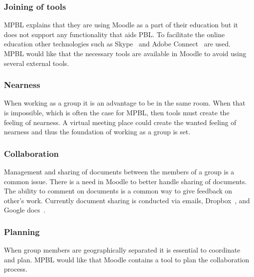 \subsubsection{Joining of tools} MPBL explains that they are using Moodle as a part of their education but it does not support any functionality that aids PBL. 
To facilitate the online education other technologies such as Skype~\cite{skype} and Adobe Connect~\cite{adobe} are used. 
MPBL would like that the necessary tools are available in Moodle to avoid using several external tools.     

\subsubsection{Nearness} When working as a group it is an advantage to be in the same room.
When that is impossible, which is often the case for MPBL, then tools must create the feeling of nearness. 
A virtual meeting place could create the wanted feeling of nearness and thus the foundation of working as a group is set.

\subsubsection{Collaboration} Management and sharing of documents between the members of a group is a common issue. 
There is a need in Moodle to better handle sharing of documents. 
The ability to comment on documents is a common way to give feedback on other's work. 
Currently document sharing is conducted via emails, Dropbox~\cite{dropbox}, and Google docs~\cite{googledocs}.

\subsubsection{Planning} When group members are geographically separated it is essential to coordinate and plan.
MPBL would like that Moodle contains a tool to plan the collaboration process.